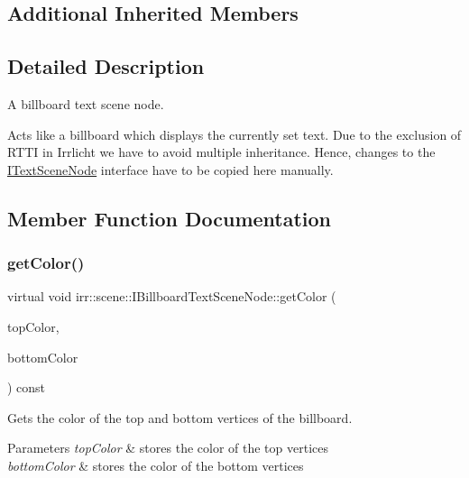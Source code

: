 \subsection*{Additional Inherited Members}


\subsection{Detailed Description}
A billboard text scene node. 

Acts like a billboard which displays the currently set text. Due to the exclusion of R\+T\+TI in Irrlicht we have to avoid multiple inheritance. Hence, changes to the \hyperlink{classirr_1_1scene_1_1ITextSceneNode}{I\+Text\+Scene\+Node} interface have to be copied here manually. 

\subsection{Member Function Documentation}
\mbox{\label{classirr_1_1scene_1_1IBillboardTextSceneNode_ac142a04e455811d5a3efa47ce2499d18}} 
\subsubsection{\texorpdfstring{get\+Color()}{getColor()}\hspace{0.1cm}{\footnotesize\ttfamily [1/2]}}
{\footnotesize\ttfamily virtual void irr\+::scene\+::\+I\+Billboard\+Text\+Scene\+Node\+::get\+Color (\begin{DoxyParamCaption}\item[{\hyperlink{classirr_1_1video_1_1SColor}{video\+::\+S\+Color} \&}]{top\+Color,  }\item[{\hyperlink{classirr_1_1video_1_1SColor}{video\+::\+S\+Color} \&}]{bottom\+Color }\end{DoxyParamCaption}) const\hspace{0.3cm}{\ttfamily [pure virtual]}}



Gets the color of the top and bottom vertices of the billboard. 


\begin{DoxyParams}{Parameters}
{\em top\+Color} & stores the color of the top vertices \\
\hline
{\em bottom\+Color} & stores the color of the bottom vertices \\
\hline
\end{DoxyParams}


